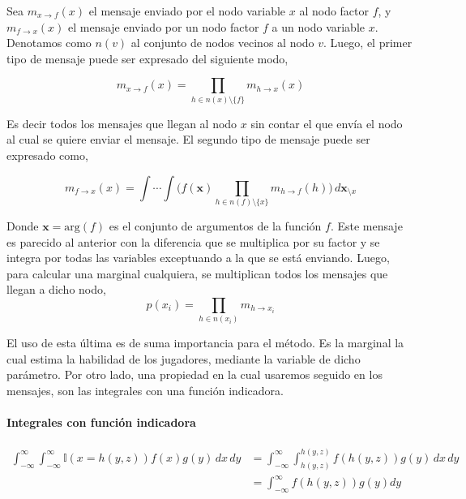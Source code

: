 \documentclass[11pt,twoside, spanish]{report} %
\begin{document}
Sea $m_{x \rightarrow f}(x)$ el mensaje enviado por el nodo variable $x$ al nodo factor $f$, y $m_{f \rightarrow x}(x)$ el mensaje enviado por un nodo factor $f$ a un nodo variable $x$.
Denotamos como $n(v)$ al conjunto de nodos vecinos al nodo $v$.
Luego, el primer tipo de mensaje puede ser expresado del siguiente modo,

\begin{equation}\label{eq:m_v_f}
m_{x \rightarrow f}(x) = \prod_{h \in n(x) \setminus \{f\} } m_{h \rightarrow x}(x)
\end{equation}

Es decir todos los mensajes que llegan al nodo $x$ sin contar el que env\'ia el nodo al cual se quiere enviar el mensaje.
El segundo tipo de mensaje puede ser expresado como,

\begin{equation}\label{eq:m_f_v}
m_{f \rightarrow x}(x) = \int \cdots \int \Big( f(\bm{x}) \prod_{h \in n(f) \setminus \{x\} } m_{h \rightarrow f}(h) \Big) \,  d\bm{x}_{\setminus x}
\end{equation}

Donde $\bm{x} = \text{arg}(f)$ es el conjunto de argumentos de la funci\'on $f$.
Este mensaje es parecido al anterior con la diferencia que se multiplica por su factor y se integra por todas las variables exceptuando a la que se est\'a enviando.
Luego, para calcular una marginal cualquiera, se multiplican todos los mensajes que llegan a dicho nodo,
\begin{equation}\label{eq:marginal}
p(x_i) = \prod_{h \in n(x_i)} m_{h \rightarrow x_i}
\end{equation}

El uso de esta \'ultima es de suma importancia para el m\'etodo.
Es la marginal la cual estima la habilidad de los jugadores, mediante la variable de dicho par\'ametro.
Por otro lado, una propiedad en la cual usaremos seguido en los mensajes, son las integrales con una funci\'on indicadora.

\paragraph{Integrales con funci\'on indicadora}
\begin{equation}\label{eq:integral_con_indicadora}
\begin{split}
\int_{-\infty}^{\infty}  \int_{-\infty}^{\infty}  \mathbb{I}(x=h(y,z)) f(x) g(y)\, dx\, dy &=  \int_{-\infty}^{\infty} \int_{h(y,z)}^{h(y,z)} f(h(y,z)) g(y)\, dx\, dy\\
& = \int_{-\infty}^{\infty} f(h(y,z)) g(y) dy
\end{split}
\end{equation}
\end{document}
